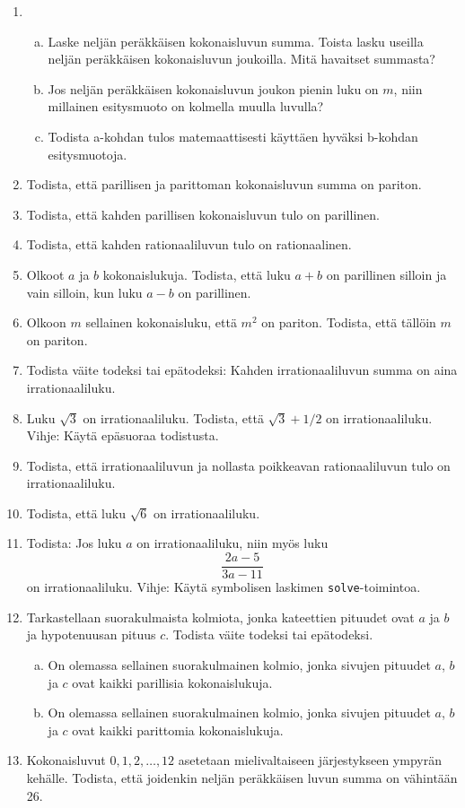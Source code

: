 \begin{enumerate}
	\item \begin{enumerate}[a)]
		\item Laske neljän peräkkäisen kokonaisluvun summa.
			Toista lasku useilla neljän peräkkäisen kokonaisluvun
			joukoilla. Mitä havaitset summasta?
		\item Jos neljän peräkkäisen kokonaisluvun joukon pienin
			luku on $m$, niin millainen esitysmuoto on kolmella
			muulla luvulla?
		\item Todista a-kohdan tulos matemaattisesti käyttäen
			hyväksi b-kohdan esitysmuotoja.
		\end{enumerate}
	\item Todista, että parillisen ja parittoman kokonaisluvun
		summa on pariton.
	\item Todista, että kahden parillisen kokonaisluvun tulo
		on parillinen.
	\item Todista, että kahden rationaaliluvun tulo on rationaalinen.
	\item Olkoot $a$ ja $b$ kokonaislukuja. Todista, että luku
		$a + b$ on parillinen silloin ja vain silloin, kun luku
		$a - b$ on parillinen.
	\item Olkoon $m$ sellainen kokonaisluku, että $m^2$ on
		pariton. Todista, että tällöin $m$ on pariton.
	\item Todista väite todeksi tai epätodeksi: Kahden
		irrationaaliluvun summa on aina irrationaaliluku.
	\item Luku $\sqrt{3}$ on irrationaaliluku. Todista,
		että $\sqrt{3}+1/2$ on irrationaaliluku. Vihje: Käytä
		epäsuoraa todistusta.
	\item Todista, että irrationaaliluvun ja nollasta poikkeavan rationaaliluvun tulo on irrationaaliluku.
	\item Todista, että luku $\sqrt{6}$ on irrationaaliluku.
	\item Todista: Jos luku $a$ on irrationaaliluku, niin
		myös luku
		\[
			\frac{2a-5}{3a-11}
		\]
		on irrationaaliluku. Vihje: Käytä symbolisen laskimen
		\texttt{solve}-toimintoa.
	\item Tarkastellaan suorakulmaista kolmiota, jonka kateettien
		pituudet ovat $a$ ja $b$ ja hypotenuusan pituus $c$.
		Todista väite todeksi tai epätodeksi.
		\begin{enumerate}[a)]
			\item On olemassa sellainen suorakulmainen kolmio,
				jonka sivujen pituudet $a$, $b$ ja $c$ ovat kaikki parillisia kokonaislukuja.
			\item On olemassa sellainen suorakulmainen kolmio,
				jonka sivujen pituudet $a$, $b$ ja $c$ ovat kaikki 
				parittomia kokonaislukuja.
		\end{enumerate}
	\item Kokonaisluvut $0, 1, 2, \ldots, 12$ asetetaan
		mielivaltaiseen järjestykseen ympyrän kehälle. Todista,
		että joidenkin neljän peräkkäisen luvun summa on
		vähintään 26.
\end{enumerate}

